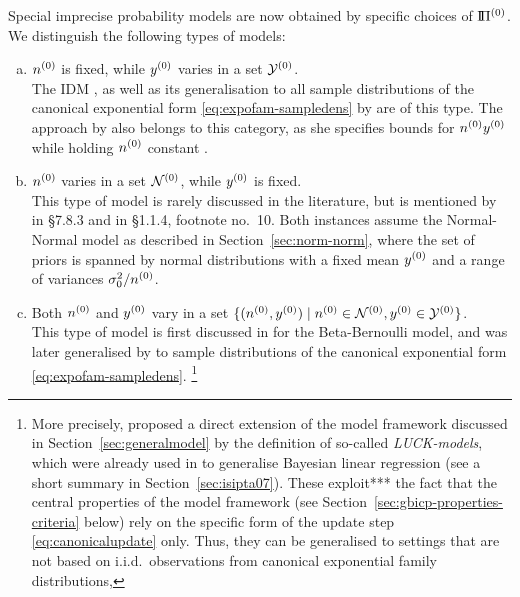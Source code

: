 Special imprecise probability models are now obtained by specific choices of $\text{I}\!\Pi^{(0)}$.
We distinguish the following types of models:
\begin{enumerate}[(a)]
\item $n^{(0)}$ is fixed, while $y^{(0)}$ varies in a set $\mathcal{Y}^{(0)}$.\\
\label{enum:modeltypes-a}%
The IDM \parencite{1996:walley::idm},
as well as its generalisation to all sample distributions of the canonical exponential form \eqref{eq:expofam-sampledens}
by \textcite{2005:quaeghebeurcooman} are of this type.
The approach by \textcite{1997:boratynska} also belongs to this category,
as she specifies bounds for $n^{(0)} y^{(0)}$ while holding $n^{(0)}$ constant \parencite[see][p.~1973]{2012:benavolizaffalon}.
\item $n^{(0)}$ varies in a set $\mathcal{N}^{(0)}$, while $y^{(0)}$ is fixed.\\
\label{enum:varyn}%
This type of model is rarely discussed in the literature,
but is mentioned by \textcite{1991:walley} in {\S 7.8.3} and in {\S 1.1.4}, footnote no.~10.
Both instances assume the Normal-Normal model as described in Section~\ref{sec:norm-norm},
where the set of priors is spanned by normal distributions with a fixed mean $y^{(0)}$ and a range of variances $\sigma_0^2 / n^{(0)}$.
\item Both $n^{(0)}$ and $y^{(0)}$ vary in a set $\{ (n^{(0)}, y^{(0)}) \mid n^{(0)} \in \mathcal{N}^{(0)}, y^{(0)} \in \mathcal{Y}^{(0)} \}$.\\
\label{enum:rectangular}%
This type of model is first discussed in \textcite[\S 5.4.3]{1991:walley} for the Beta-Bernoulli model,
and was later generalised by \textcite{Walter2009a}
to sample distributions of the canonical exponential form \eqref{eq:expofam-sampledens}.%
\footnote{%
More precisely, \textcite[see Section~\ref{sec:jstp}]{Walter2009a} proposed
a direct extension of the model framework discussed in Section~\ref{sec:generalmodel}
by the definition of so-called \emph{LUCK-models},
which were already used in \textcite{Walter2007a}
to generalise Bayesian linear regression (see a short summary in Section~\ref{sec:isipta07}).
These exploit*** the fact that the central properties of the model framework
(see Section~\ref{sec:gbicp-properties-criteria} below)
rely on the specific form of the update step \eqref{eq:canonicalupdate} only.
Thus, they can be generalised to settings that are not based on i.i.d.\ observations from canonical exponential family distributions,
}
\end{enumerate}
